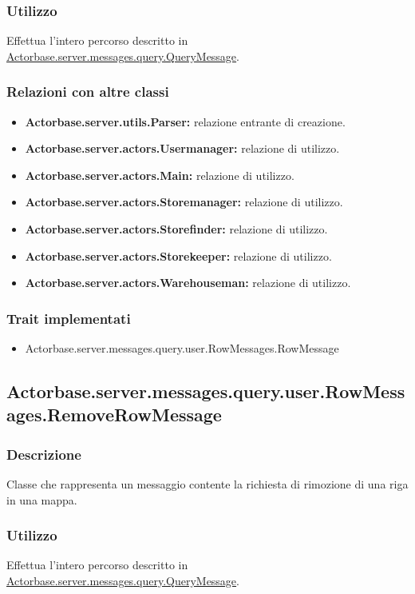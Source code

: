 \documentclass[a4paper]{article}
\begin{document}
			\subsubsection{Utilizzo}
				Effettua l'intero percorso descritto in \hyperref[QueryMessage]{Actorbase.server.messages.query.QueryMessage}.
				
			\subsubsection{Relazioni con altre classi}
				\begin{itemize}
					\item \textbf{Actorbase.server.utils.Parser:} relazione entrante di creazione.
					\item \textbf{Actorbase.server.actors.Usermanager:} relazione di utilizzo.
					\item \textbf{Actorbase.server.actors.Main:} relazione di utilizzo.
					\item \textbf{Actorbase.server.actors.Storemanager:} relazione di utilizzo.
					\item \textbf{Actorbase.server.actors.Storefinder:} relazione di utilizzo.
					\item \textbf{Actorbase.server.actors.Storekeeper:} relazione di utilizzo.
					\item \textbf{Actorbase.server.actors.Warehouseman:} relazione di utilizzo.
				\end{itemize}
			\subsubsection{Trait implementati}
				\begin{itemize}
					\item Actorbase.server.messages.query.user.RowMessages.RowMessage
				\end{itemize}
				
		\subsection{Actorbase.server.messages.query.user.RowMessages.RemoveRowMessage}
			\subsubsection{Descrizione}
				Classe che rappresenta un messaggio contente la richiesta di rimozione di una riga in una mappa.
				
			\subsubsection{Utilizzo}
				Effettua l'intero percorso descritto in \hyperref[QueryMessage]{Actorbase.server.messages.query.QueryMessage}.
				
\end{document}
